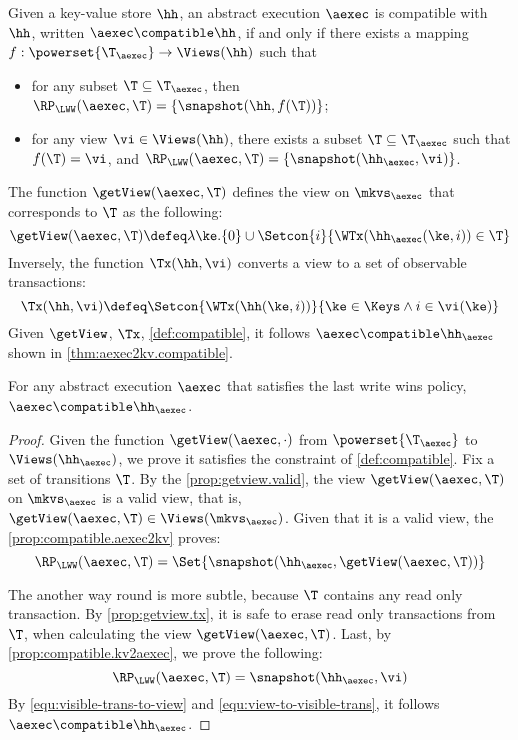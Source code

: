 \begin{definition}
\label{def:compatible}
Given a key-value store $\hh$,
an abstract execution $\aexec$ is compatible with $\hh$, written 
$\aexec \compatible \hh$, if and only if there exists a  mapping 
$f: \powerset{\T_{\aexec}} \rightarrow \Views(\hh)$
such that  
\begin{itemize}
\item for any subset $\T \subseteq \T_{\aexec}$, then $\RP_{\LWW}(\aexec, \T) = \{\snapshot(\hh, f(\T))\}$; 
\item for any view $\vi \in \Views(\hh)$, there exists a subset $\T \subseteq \T_{\aexec}$ 
such that $f(\T) = \vi$, and $\RP_{\LWW}(\aexec, \T) = \{\snapshot(\hh_{\aexec}, \vi)\}$.
\end{itemize}
\end{definition}

The function $\getView(\aexec, \T)$ defines the view on \( \mkvs_\aexec \) that corresponds to \( \T \) as the following:
\[
    \getView(\aexec, \T) \defeq \lambda \ke. \{0\} \cup \Setcon{ i }{\WTx(\hh_{\aexec}(\ke, i)) \in \T}
\]
Inversely, the function \( \Tx(\hh, \vi) \) converts a view to a set of observable transactions:
\[
\Tx(\hh, \vi) \defeq \Setcon{ \WTx(\hh(\ke, i)) }{ \ke \in \Keys \wedge i \in \vi(\ke) }
\]
Given \( \getView \), \( \Tx \), \cref{def:compatible}, 
it follows \( \aexec \compatible \hh_{\aexec} \) shown in \cref{thm:aexec2kv.compatible}.

\begin{theorem}
\label{thm:aexec2kv.compatible}
For any abstract execution $\aexec$ that satisfies the last write wins policy, $\aexec \compatible \hh_{\aexec}$.
\end{theorem}
\begin{proof}
Given the function $\getView(\aexec, \cdot )$ from $\powerset{\T_{\aexec}}$ to $\Views(\hh_{\aexec})$,
we prove it satisfies the constraint of \cref{def:compatible}.
Fix a set of transitions \( \T \).
By the \cref{prop:getview.valid}, the view $\getView(\aexec, \T )$  on \( \mkvs_\aexec \) is a valid view,
that is, \( \getView(\aexec, \T ) \in \Views(\mkvs_\aexec) \).
Given that it is a valid view, the \cref{prop:compatible.aexec2kv} proves:
\begin{equation}
    \label{equ:visible-trans-to-view}
    \RP_{\LWW}(\aexec, \T) = \Set{\snapshot(\hh_{\aexec}, \getView(\aexec, \T))} 
\end{equation}

The another way round is more subtle,
because \( \T \) contains any read only transaction.
By \cref{prop:getview.tx}, it is safe to erase read only transactions from \( \T \),
when calculating the view \( \getView(\aexec, \T ) \).
Last, by \cref{prop:compatible.kv2aexec}, we prove the following:
\begin{equation}
    \label{equ:view-to-visible-trans}
    \RP_{\LWW}(\aexec, \T) = \snapshot(\hh_{\aexec}, \vi)
\end{equation}
By \cref{equ:visible-trans-to-view} and \cref{equ:view-to-visible-trans},
it follows \( \aexec \compatible \hh_{\aexec} \).
\end{proof}

